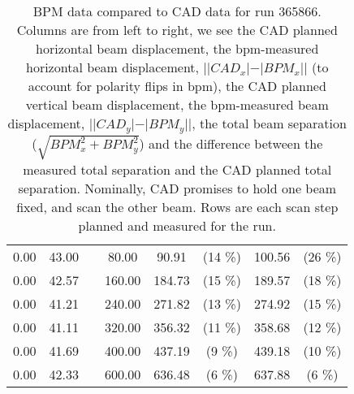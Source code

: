 \begin{table}
\begin{tabular}{c c c c c c c c}
0.00 & 43.00 &  & 80.00 & 90.91 &  (14 \%) & 100.56 &  (26 \%)\\
0.00 & 42.57 &  & 160.00 & 184.73 &  (15 \%) & 189.57 &  (18 \%)\\
0.00 & 41.21 &  & 240.00 & 271.82 &  (13 \%) & 274.92 &  (15 \%)\\
0.00 & 41.11 &  & 320.00 & 356.32 &  (11 \%) & 358.68 &  (12 \%)\\
0.00 & 41.69 &  & 400.00 & 437.19 &  (9 \%) & 439.18 &  (10 \%)\\
0.00 & 42.33 &  & 600.00 & 636.48 &  (6 \%) & 637.88 &  (6 \%)\\
\bottomrule
\end{tabular}
\caption{ BPM data compared to CAD data for run 365866. Columns are from left to right, we see the CAD planned horizontal beam displacement, the bpm-measured horizontal beam displacement, $||CAD_{x}| - |BPM_{x}||$ (to account for polarity flips in bpm), the CAD planned vertical beam displacement, the bpm-measured beam displacement, $||CAD_{y}| - |BPM_{y}||$, the total beam separation ($\sqrt{BPM_{x}^2+BPM_{y}^2}$) and the difference between the measured total separation and the CAD planned total separation. Nominally, CAD promises to hold one beam fixed, and scan the other beam. Rows are each scan step planned and measured for the run. }
\label{0xffd6370c}
\end{table}
